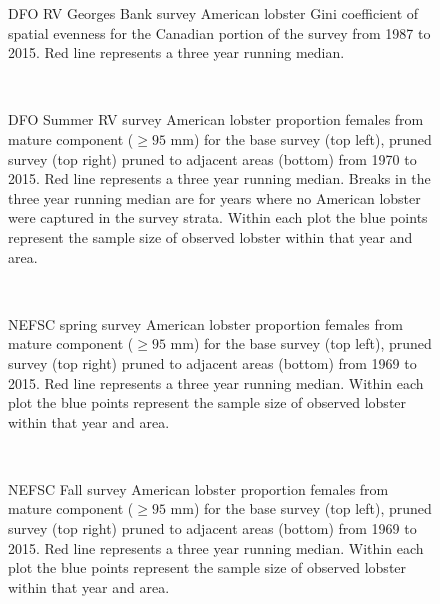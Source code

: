 \documentclass[11pt]{article}
\newcommand{\e}{/backup/bio_data/bio.lobster/figures/} %
\begin{document}
\begin{figure}

    \caption{DFO RV Georges Bank survey American lobster Gini coefficient of spatial evenness for the Canadian portion of the survey from 1987 to 2015. Red line represents a three year running median. }

\end{figure}


\begin{figure}
\centering
{}\\
\caption{DFO Summer RV survey American lobster proportion females from mature component ($ \ge 95$ mm) for the base survey (top left), pruned survey (top right) pruned to adjacent areas (bottom) from 1970 to 2015. Red line represents a three year running median. Breaks in the three year running median are for years where no American lobster were captured in the survey strata. Within each plot the blue points represent the sample size of observed lobster within that year and area.}
\end{figure}
\clearpage


\begin{figure}
\centering
{}\\
\caption{NEFSC spring survey American lobster proportion females from mature component ($ \ge 95$ mm) for the base survey (top left), pruned survey (top right) pruned to adjacent areas (bottom) from 1969 to 2015. Red line represents a three year running median. Within each plot the blue points represent the sample size of observed lobster within that year and area. }
\end{figure}
\clearpage



\begin{figure}
\centering
{}\\
\caption{NEFSC Fall survey American lobster proportion females from mature component ($ \ge 95$ mm) for the base survey (top left), pruned survey (top right) pruned to adjacent areas (bottom) from 1969 to 2015. Red line represents a three year running median. Within each plot the blue points represent the sample size of observed lobster within that year and area. }
\end{figure}
\clearpage
\end{document}
